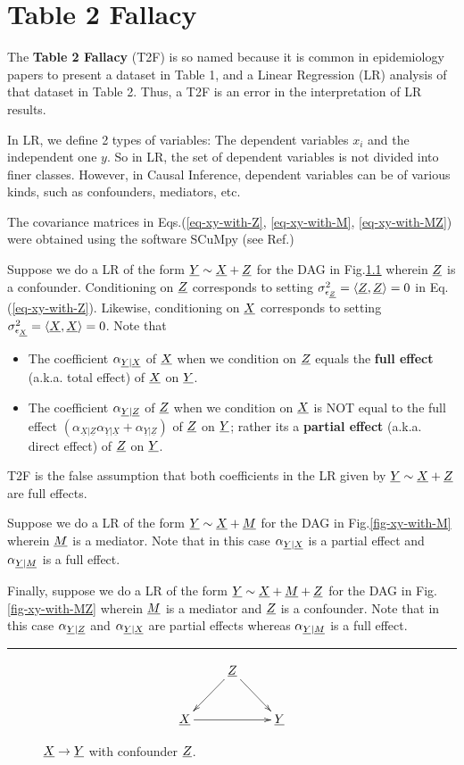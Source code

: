 \chapter{Table 2 Fallacy}
\label{ch-table-2-fallacy}
The {\bf Table 2 Fallacy} (T2F) is so named
because it is common in epidemiology papers
to present a dataset in Table 1, 
and a Linear Regression (LR) analysis of that dataset in Table 2.
Thus, a T2F is an error in the interpretation of LR results.

In LR, we define 2 types of variables:
The dependent variables $x_i$
and the  independent one $y$. So
in LR, the set of dependent variables is  
not divided into finer classes. However, in Causal Inference,
dependent variables can be of various kinds, such as confounders, mediators, etc.

The covariance matrices in Eqs.(\ref{eq-xy-with-Z}, \ref{eq-xy-with-M}, \ref{eq-xy-with-MZ}) were obtained
using the software SCuMpy (see Ref.\cite{scumpy})

Suppose we do a LR of the form ${\underline{Y}} \sim {\underline{X}} + {\underline{Z}}$
for the DAG in Fig.\ref{fig-xy-with-Z}
wherein ${\underline{Z}}$ is a confounder.
Conditioning on ${\underline{Z}}$ corresponds to
setting $\sigma^2_{\epsilon_{\underline{Z}}}=\left\langle{\underline{Z}}, {\underline{Z}}\right\rangle=0$ in Eq.(\ref{eq-xy-with-Z}).
Likewise, conditioning on ${\underline{X}}$ corresponds to
setting $\sigma^2_{\epsilon_{\underline{X}}}=\left\langle{\underline{X}}, {\underline{X}}\right\rangle=0$.
Note that
\begin{itemize}
\item
The coefficient  $\alpha_{{\underline{Y}}|{\underline{X}}}$ of ${\underline{X}}$ when we condition on ${\underline{Z}}$ equals the {\bf full effect} (a.k.a. {total effect})
of ${\underline{X}}$ on ${\underline{Y}}$.
\item
The coefficient $\alpha_{{\underline{Y}}|{\underline{Z}}}$ of ${\underline{Z}}$ when we condition on ${\underline{X}}$
is NOT equal to the full effect 
$\left(\alpha_{\underline{X}|\underline{Z}} \alpha_{\underline{Y}|\underline{X}} + \alpha_{\underline{Y}|\underline{Z}}\right)$ of ${\underline{Z}}$ on ${\underline{Y}}$;  rather its a {\bf partial effect} (a.k.a. {direct effect})
of ${\underline{Z}}$ on ${\underline{Y}}$.
\end{itemize}
T2F is the false assumption that both
coefficients in the LR given by ${\underline{Y}}\sim {\underline{X}} +{\underline{Z}}$
are full effects.

Suppose we do a LR of the form ${\underline{Y}} \sim {\underline{X}} + {\underline{M}}$
for the DAG in Fig.\ref{fig-xy-with-M}
wherein ${\underline{M}}$ is a mediator.
Note that in this case $\alpha_{{\underline{Y}}|{\underline{X}}}$
is a partial effect and $\alpha_{{\underline{Y}}|{\underline{M}}}$ is a full effect.

Finally, suppose we do a LR of the form ${\underline{Y}} \sim {\underline{X}} + {\underline{M}} +{\underline{Z}}$
for the DAG in Fig.\ref{fig-xy-with-MZ}
wherein ${\underline{M}}$ is a mediator and ${\underline{Z}}$ is a confounder.
Note that in this case $\alpha_{{\underline{Y}}|{\underline{Z}}}$ and
$\alpha_{{\underline{Y}}|{\underline{X}}}$ are partial effects whereas $\alpha_{{\underline{Y}}|{\underline{M}}}$ is a full effect.
\newpage
\hrule
\begin{figure}[!h]
$$
\xymatrix{
&\rvZ\ar[dl]\ar[dr]
\\
\rvX\ar[rr]&&\rvY
}$$
\caption{${\underline{X}}\rightarrow{\underline{Y}}$ with confounder ${\underline{Z}}$.}
\label{fig-xy-with-Z}
\end{figure}


